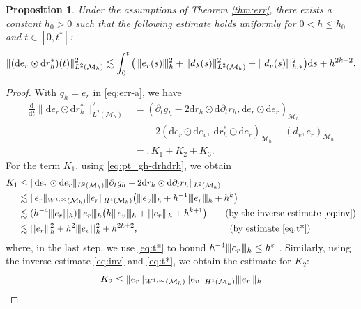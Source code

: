 \documentclass[11pt,a4paper,oneside,reqno]{amsart}
\theoremstyle{definition}
\theoremstyle{plain}
\newtheorem{proposition}{Proposition}
\numberwithin{theorem}{section}
\numberwithin{proposition}{section}
\numberwithin{lemma}{section}
\numberwithin{equation}{section}
\newcommand{\Man}{\mathcal{M}}
\newcommand{\normt}[1]{%
	\vert\kern-0.9pt\vert\kern-0.9pt\vert #1
	\vert\kern-0.9pt\vert\kern-0.9pt\vert}
\begin{document}
\begin{proposition}\label{prop:esti_drder}
    Under the assumptions of Theorem \ref{thm:err}, there exists a constant $h_0 > 0$ such that the following estimate holds uniformly for $0<h\leq h_0$ and $t\in[0,t^{*}]${\rm:}
    \begin{equation}\label{eq:esti_drder} 
        \|(\mathrm{d} e_{r} \odot \mathrm{d} r_h^*)(t)\|^2_{L^2(\Man_h)} 
     \lesssim 
    \int_0^t \big(\normt{e_r(s)}^2_h + \| d_\lambda(s) \|_{L^2(\Man_h)}^2 + \normt{d_v(s)}_{h,*}^2 \big)\mathrm{d}s
    + h^{2k+2}.
    \end{equation} 

\end{proposition}
\begin{proof}

With \( q_h = e_{r} \) in \eqref{eq:err-a}, we have  
\[
\begin{aligned}
     \frac{\mathrm{d}}{\mathrm{d}t}\|\mathrm{d} e_{r} \odot \mathrm{d} r_h^*\|_{L^2(\Man_h)}^2 
& = ( \partial_t g_h - 2 \mathrm{d}r_h \odot \mathrm{d} \partial_t r_h, \mathrm{d}e_r \odot \mathrm{d}e_{r}   )_{\Man_h} 
\\
& \quad -  2 ( \mathrm{d}e_r \odot \mathrm{d}e_v,\ \mathrm{d}r_h^* \odot \mathrm{d}e_{r}  )_{\Man_h} 
- (d_v, e_{r})_{\Man_h}  
\\
&=: K_1 + K_2 + K_3. 
\end{aligned}\]
For the term \(K_1\), using \eqref{eq:pt_gh-drhdrh}, we obtain
\[
\begin{aligned}
K_1 &
\leq \|\mathrm{d}e_r \odot \mathrm{d}e_{r} \|_{L^2(\Man_h)}
\|  \partial_t g_h - 2 \mathrm{d}r_h \odot \mathrm{d} \partial_t r_h \|_{L^2(\Man_h)}
\\
& \lesssim \| e_r  \|_{W^{1, \infty}(\Man_h)} \| e_r \|_{H^1(\Man_h)}
\bigl( \normt{e_v}_h + h^{-1}\normt{e_r}_h + h^k \bigr)
\\
& \lesssim (h^{-4} \normt{e_r}_h )\normt{e_r}_h
\bigl( h\normt{e_v}_h + \normt{e_r}_h + h^{k+1} \bigr)
\qquad \text{(by the inverse estimate \eqref{eq:inv})}
\\
&\lesssim \normt{e_r}_h^2 + h^2\normt{ e_v}_h^2 + h^{2k+2},
\qquad\qquad\qquad\qquad\qquad \text{(by estimate \eqref{eq:t*})}
\end{aligned}
\]
where, in the last step, we use \eqref{eq:t*} to bound \(h^{-4}\normt{e_r}_h \le h^{\varepsilon}\) .
Similarly, using the inverse estimate \eqref{eq:inv} and \eqref{eq:t*}, we obtain the estimate for \(K_2\):
\[
K_2 \leq \| e_r \|_{W^{1,\infty}(\Man_h)} \| e_v \|_{H^1(\Man_h)} \normt{e_r}_h
\]
\end{proof}
\end{document}
